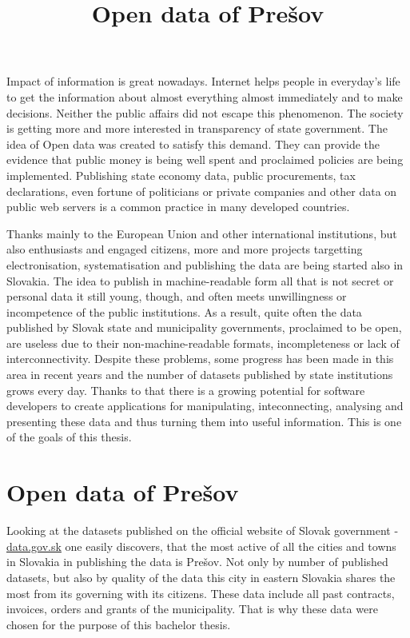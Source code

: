 \documentclass[thesis=B,english]{FITthesis}[2012/06/26]
\title{Open data of Prešov}
\begin{document}

\begin{introduction}
	Impact of information is great nowadays. Internet helps people in everyday's life to get the information about almost everything almost immediately and to make decisions.
	Neither the public affairs did not escape this phenomenon. The society is getting more and more interested in transparency of state government. The idea of Open data was created to satisfy this demand. They can provide the evidence that public money is being well spent and proclaimed policies are being implemented. Publishing state economy data, public procurements, tax declarations, even fortune of politicians or private companies and other data on public web servers is a common practice in many developed countries.
	\par Thanks mainly to the European Union and other international institutions, but also enthusiasts and engaged citizens, more and more projects targetting electronisation, systematisation and publishing the data are being started also in Slovakia. The idea to publish in machine-readable form all that is not secret or personal data it still young, though, and often meets unwillingness or incompetence of the public institutions. As a result, quite often the data published by Slovak state and municipality governments, proclaimed to be open, are useless due to their non-machine-readable formats, incompleteness or lack of interconnectivity.
		Despite these problems, some progress has been made in this area in recent years and the number of datasets published by state institutions grows every day. Thanks to that there is a growing potential for software developers to create applications for manipulating, inteconnecting, analysing and presenting these data and thus turning them into useful information. This is one of the goals of this thesis.
	\section*{Open data of Prešov}
	Looking at the datasets published on the official website of Slovak government - \href{https://data.gov.sk}{data.gov.sk} one easily discovers, that the most active of all the cities and towns in Slovakia in publishing the data is Prešov. Not only by number of published datasets, but also by quality of the data this city in eastern Slovakia shares the most from its governing with its citizens. These data include all past contracts, invoices, orders and grants of the municipality. That is why these data were chosen for the purpose of this bachelor thesis.

\end{introduction}
\end{document}
